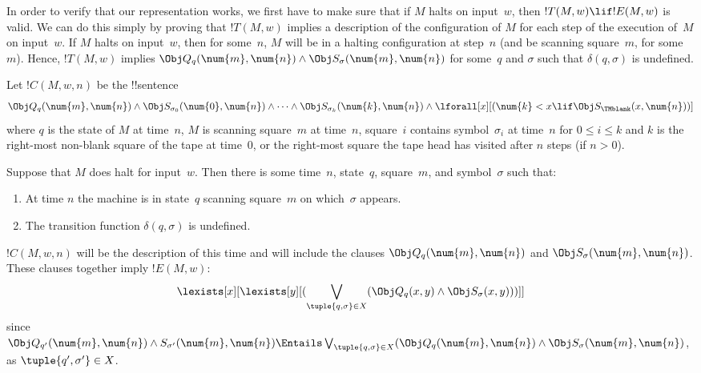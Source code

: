 \documentclass[../../../include/open-logic-section]{subfiles}
\begin{document}

\begin{explain}
In order to verify that our representation works, we first have to
make sure that if $M$ halts on input~$w$, then $!T(M, w) \lif !E(M,
w)$ is valid. We can do this simply by proving that $!T(M, w)$ implies
a description of the configuration of $M$ for each step of the
execution of~$M$ on input~$w$. If $M$ halts on input~$w$, then for
some~$n$, $M$ will be in a halting configuration at step~$n$ (and be
scanning square~$m$, for some $m$). Hence, $!T(M, w)$ implies $\Obj
Q_q(\num{m}, \num{n}) \land \Obj S_\sigma(\num{m}, \num{n})$ for
some~$q$ and $\sigma$ such that $\delta(q, \sigma)$ is undefined.
\end{explain}

\begin{defn} 
Let $!C(M, w, n)$ be the !!{sentence}
\[ 
\Obj Q_q(\num{m}, \num{n}) \land \Obj S_{\sigma_0}(\num{0}, \num{n})
\land \dots \land \Obj S_{\sigma_k}(\num{k}, \num{n}) \land
\lforall[x][(\num{k} < x \lif \Obj S_\TMblank(x, \num{n}))]
\] 
where $q$ is the state of $M$ at time~$n$, $M$ is scanning square~$m$
at time~$n$, square~$i$ contains symbol~$\sigma_i$ at time~$n$ for $0
\le i \le k$ and $k$ is the right-most non-blank square of the tape at
time~$0$, or the right-most square the tape head has visited after $n$
steps (if $n >0$).
\end{defn}

Suppose that $M$ does halt for input~$w$. Then there is some
time~$n$, state~$q$, square~$m$, and symbol~$\sigma$ such that:
\begin{enumerate} 
\item At time $n$ the machine is in state~$q$ scanning square~$m$ on
  which~$\sigma$ appears.
\item The transition function $\delta(q, \sigma)$ is undefined.
\end{enumerate}

$!C(M, w, n)$ will be the description of this time and will include
the clauses $\Obj Q_{q}(\num{m}, \num{n})$ and $\Obj
S_{\sigma}(\num{m}, \num{n})$. These clauses together imply $!E(M,
w)$:
\[
\lexists[x][\lexists[y][(\bigvee_{\tuple{q, \sigma} \in
      X}(\Obj Q_q(x, y) \land \Obj S_\sigma(x, y)))]]
\]
since $\Obj Q_{q'}(\num{m}, \num{n}) \land S_{\sigma'}(\num{m},
\num{n}) \Entails \bigvee_{\tuple{q, \sigma} \in X} (\Obj Q_q(\num{m},
\num{n}) \land \Obj S_{\sigma}(\num{m}, \num{n})$, as
$\tuple{q',\sigma'} \in X$.
\end{document}
